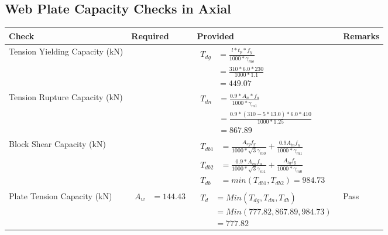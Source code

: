 \documentclass{article}%
\begin{document}
\subsection{Web Plate Capacity Checks in Axial}%
\label{subsec:WebPlateCapacityChecksinAxial}%
\renewcommand{\arraystretch}{1.2}%
\begin{longtable}{|p{4cm}|p{6cm}|p{5.5cm}|p{1.5cm}|}%
\hline%
\rowcolor{OsdagGreen}%
Check&Required&Provided&Remarks\\%
\hline%
\endhead%
\hline%
Tension Yielding Capacity (kN)&&$\begin{aligned} T_{dg} &= \frac{l*t_p*f_y}{1000*\gamma_{mo}}\\ &=\frac{310*6.0*230}{1000*1.1}\\ &=449.07\end{aligned}$&\\%
\hline%
Tension Rupture Capacity (kN)&&$\begin{aligned} T_{dn} &= \frac{0.9*A_{n}*f_u}{1000*\gamma_{m1}}\\ &=\frac{0.9*(310-5*13.0)*6.0*410}{1000*1.25}\\ &=867.89\end{aligned}$&\\%
\hline%
Block Shear Capacity (kN)&&$\begin{aligned}T_{db1} &= \frac{A_{vg} f_{y}}{1000*\sqrt{3} \gamma_{m0}} + \frac{0.9 A_{tn} f_{u}}{1000*\gamma_{m1}}\\ T_{db2} &= \frac{0.9*A_{vn} f_{u}}{1000*\sqrt{3} \gamma_{m1}} + \frac{A_{tg} f_{y}}{1000*\gamma_{m0}}\\ T_{db} &= min(T_{db1}, T_{db2})= 984.73\end{aligned}$&\\%
\hline%
Plate Tension Capacity (kN)&$\begin{aligned} A_w &=144.43 \end{aligned}$&$\begin{aligned} T_d &= Min(T_{dg},T_{dn},T_{db})\\ &= Min(777.82,867.89,984.73)\\ &=777.82\end{aligned}$&Pass\\%
\hline%
\end{longtable}

%
\newpage%
\end{document}
